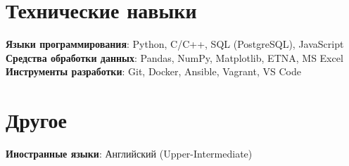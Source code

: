 \section{Технические навыки}
\begin{itemize}[leftmargin=0.15in, label={}]
  \small{\item{
        \textbf{Языки программирования}{: Python, C/C++, SQL (PostgreSQL), JavaScript} \\
        \textbf{Средства обработки данных}{: Pandas, NumPy, Matplotlib, ETNA, MS Excel} \\
        \textbf{Инструменты разработки}{: Git, Docker, Ansible, Vagrant, VS Code} \\
        }}
\end{itemize}

\section{Другое}
\begin{itemize}[leftmargin=0.15in, label={}]
  \small{\item{
        \textbf{Иностранные языки}{: Английский (Upper-Intermediate)} \\
        }}
\end{itemize}
